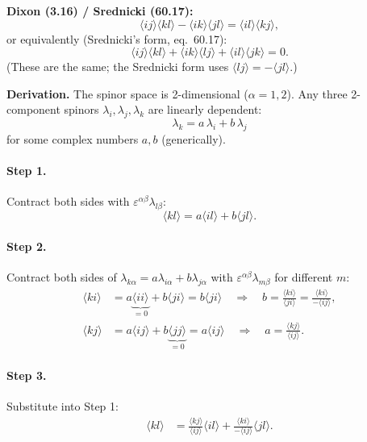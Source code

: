 \textbf{Dixon (3.16) / Srednicki (60.17):}
\begin{equation}
  \langle ij\rangle\langle kl\rangle - \langle ik\rangle\langle jl\rangle
  = \langle il\rangle\langle kj\rangle,
  \tag{Dixon 3.16}
\end{equation}
or equivalently (Srednicki's form, eq.~60.17):
\begin{equation}
  \langle ij\rangle\langle kl\rangle + \langle ik\rangle\langle lj\rangle + \langle il\rangle\langle jk\rangle = 0.
  \tag{Sred 60.17}
\end{equation}
(These are the same; the Srednicki form uses $\langle lj\rangle=-\langle jl\rangle$.)

\textbf{Derivation.}
The spinor space is 2-dimensional ($\alpha=1,2$). Any three 2-component spinors
$\lambda_i, \lambda_j, \lambda_k$ are linearly dependent:
\begin{equation}
  \lambda_k = a\,\lambda_i + b\,\lambda_j
\end{equation}
for some complex numbers $a,b$ (generically).

\paragraph{Step 1.} Contract both sides with $\varepsilon^{\alpha\beta}\lambda_{l\beta}$:
\begin{equation}
  \langle kl\rangle = a\langle il\rangle + b\langle jl\rangle.
\end{equation}

\paragraph{Step 2.} Contract both sides of $\lambda_{k\alpha}=a\lambda_{i\alpha}+b\lambda_{j\alpha}$
with $\varepsilon^{\alpha\beta}\lambda_{m\beta}$ for different $m$:
\begin{align}
  \langle ki\rangle &= a\underbrace{\langle ii\rangle}_{=0} + b\langle ji\rangle = b\langle ji\rangle
  \quad\Rightarrow\quad b = \frac{\langle ki\rangle}{\langle ji\rangle} = \frac{\langle ki\rangle}{-\langle ij\rangle}, \\
  \langle kj\rangle &= a\langle ij\rangle + b\underbrace{\langle jj\rangle}_{=0} = a\langle ij\rangle
  \quad\Rightarrow\quad a = \frac{\langle kj\rangle}{\langle ij\rangle}.
\end{align}

\paragraph{Step 3.} Substitute into Step 1:
\begin{align}
  \langle kl\rangle &= \frac{\langle kj\rangle}{\langle ij\rangle}\langle il\rangle
                     + \frac{\langle ki\rangle}{-\langle ij\rangle}\langle jl\rangle.
\end{align}

